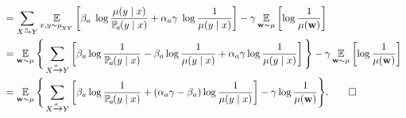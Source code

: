 \begin{subappendices}
\begin{lproof}
\begin{align*}
		&= \sum\alle 
			\Ex_{x,y \sim \mu_{\!_{XY}}}  \left[ \beta_a\; \log\frac{\mu(y\mid x)}{\p_a(y\mid x)} + \alpha_a\gamma \; \log \frac{1}{\mu(y\mid x)}  \right]  - \gamma  \Ex_{\mat w \sim \mu} \left[ \log \frac{1}{\mu(\mat w)}\right] \\
		&= \Ex_{\mat w \sim \mu} \Bigg\{   \sum_{ X \xrightarrow{\!\!a} Y  } \left[
			\beta_a \log \frac{1}{\p_a(y\mid x)}   - \beta_a  \log \frac{1}{\mu(y \mid x)}+ \alpha_a\gamma \log \frac{1}{\mu(y \mid x)} \right]\Bigg\}  -  \gamma  \Ex_{\mat w \sim \mu} \left[\log \frac{1}{\mu(\mat w)}\right] \\
		&=  \Ex_{\mat w \sim \mu} \Bigg\{ \sum_{ X \xrightarrow{\!\!a} Y  } \left[
			\beta_a \log \frac{1}{\p_a(y\mid x)} +
	                        (\alpha_a\gamma - \beta_a ) \log
	                        \frac{1}{\mu(y \mid x)} \right] -
	                        \gamma \log \frac{1}{\mu(\mat w)}  \Bigg\}.  
                \qedhere
	\end{align*}
\end{lproof}


\end{subappendices}
